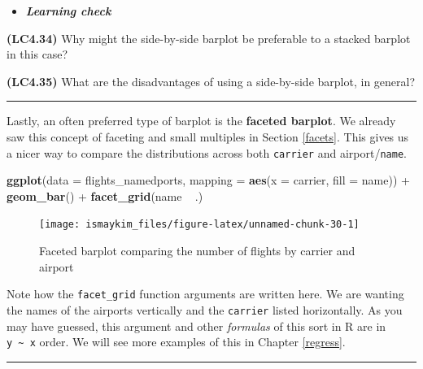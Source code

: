 \documentclass[]{tufte-book}
\newenvironment{Shaded}{\begin{snugshade}}{\end{snugshade}}
\newcommand{\KeywordTok}[1]{\textcolor[rgb]{0.13,0.29,0.53}{\textbf{{#1}}}}
\newcommand{\DataTypeTok}[1]{\textcolor[rgb]{0.13,0.29,0.53}{{#1}}}
\newcommand{\StringTok}[1]{\textcolor[rgb]{0.31,0.60,0.02}{{#1}}}
\newcommand{\NormalTok}[1]{{#1}}
\let\oldrule=\rule
\renewcommand{\rule}[1]{\oldrule{\linewidth}}
\newenvironment{rmdblock}[1]
  {\begin{shaded*}
  \begin{itemize}
  \renewcommand{\labelitemi}{
    \raisebox{-.7\height}[0pt][0pt]{
    }
  }
  \item
  }
  {
  \end{itemize}
  \end{shaded*}
  }
\newenvironment{learncheck}
  {\begin{rmdblock}{warning}}
  {\end{rmdblock}}
\begin{document}
\begin{learncheck}
\textbf{\emph{Learning check}}
\end{learncheck}

\textbf{(LC4.34)} Why might the side-by-side barplot be preferable to a
stacked barplot in this case?

\textbf{(LC4.35)} What are the disadvantages of using a side-by-side
barplot, in general?

\begin{center}\rule{0.5\linewidth}{\linethickness}\end{center}

Lastly, an often preferred type of barplot is the \textbf{faceted
barplot}. We already saw this concept of faceting and small multiples in
Section \ref{facets}. This gives us a nicer way to compare the
distributions across both \texttt{carrier} and airport/\texttt{name}.

\begin{Shaded}
\begin{Highlighting}[]
\KeywordTok{ggplot}\NormalTok{(}\DataTypeTok{data =} \NormalTok{flights_namedports, }\DataTypeTok{mapping =} \KeywordTok{aes}\NormalTok{(}\DataTypeTok{x =} \NormalTok{carrier, }\DataTypeTok{fill =} \NormalTok{name)) +}
\StringTok{  }\KeywordTok{geom_bar}\NormalTok{() +}
\StringTok{  }\KeywordTok{facet_grid}\NormalTok{(name ~}\StringTok{ }\NormalTok{.)}
\end{Highlighting}
\end{Shaded}

\begin{figure}

{\centering \texttt{[image: ismaykim\_files/figure-latex/unnamed-chunk-30-1]} 

}

\caption[Faceted barplot comparing the number of flights by carrier and airport]{Faceted barplot comparing the number of flights by carrier and airport}\label{fig:unnamed-chunk-30}
\end{figure}

Note how the \texttt{facet\_grid} function arguments are written here.
We are wanting the names of the airports vertically and the
\texttt{carrier} listed horizontally. As you may have guessed, this
argument and other \emph{formulas} of this sort in R are in
\texttt{y\ \textasciitilde{}\ x} order. We will see more examples of
this in Chapter \ref{regress}.

\begin{center}\rule{0.5\linewidth}{\linethickness}\end{center}
\end{document}
